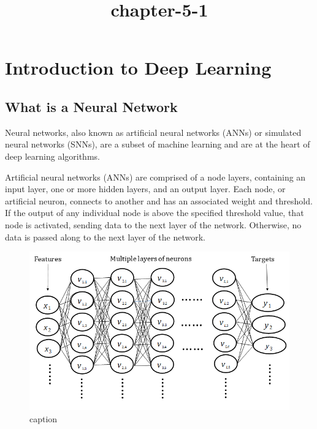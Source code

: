 \documentclass[11pt]{article}
\title{chapter-5-1}
\begin{document}
    
    \maketitle
    
    

    
    \hypertarget{introduction-to-deep-learning}{%
\section{Introduction to Deep
Learning}\label{introduction-to-deep-learning}}

    \hypertarget{what-is-a-neural-network}{%
\subsection{What is a Neural Network}\label{what-is-a-neural-network}}

Neural networks, also known as artificial neural networks (ANNs) or
simulated neural networks (SNNs), are a subset of machine learning and
are at the heart of deep learning algorithms.

Artificial neural networks (ANNs) are comprised of a node layers,
containing an input layer, one or more hidden layers, and an output
layer. Each node, or artificial neuron, connects to another and has an
associated weight and threshold. If the output of any individual node is
above the specified threshold value, that node is activated, sending
data to the next layer of the network. Otherwise, no data is passed
along to the next layer of the network.

    \begin{figure}
\centering
\includegraphics{./pic/chapter-5-1_pic_0.png}
\caption{caption}
\end{figure}
\end{document}
